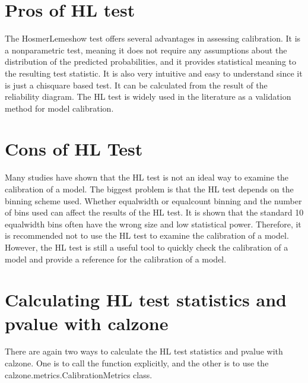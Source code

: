 \documentclass[letterpaper,10pt,english]{sphinxmanual}
\begin{document}
\section{Pros of HL test}
\label{\detokenize{notebooks/hl_test:Pros-of-HL-test}}
\sphinxAtStartPar
The Hosmer\sphinxhyphen{}Lemeshow test offers several advantages in assessing calibration. It is a non\sphinxhyphen{}parametric test, meaning it does not require any assumptions about the distribution of the predicted probabilities, and it provides statistical meaning to the resulting test statistic. It is also very intuitive and easy to understand since it is just a chi\sphinxhyphen{}square based test. It can be calculated from the result of the reliability diagram. The HL test is widely used in the literature as a validation method
for model calibration.


\section{Cons of HL Test}
\label{\detokenize{notebooks/hl_test:Cons-of-HL-Test}}
\sphinxAtStartPar
Many studies have shown that the HL test is not an ideal way to examine the calibration of a model. The biggest problem is that the HL test depends on the binning scheme used. Whether equal\sphinxhyphen{}width or equal\sphinxhyphen{}count binning and the number of bins used can affect the results of the HL test. It is shown that the standard 10 equal\sphinxhyphen{}width bins often have the wrong size and low statistical power. Therefore, it is recommended not to use the HL test to examine the calibration of a model. However, the HL test
is still a useful tool to quickly check the calibration of a model and provide a reference for the calibration of a model.


\section{Calculating HL test statistics and p\sphinxhyphen{}value with calzone}
\label{\detokenize{notebooks/hl_test:Calculating-HL-test-statistics-and-p-value-with-calzone}}
\sphinxAtStartPar
There are again two ways to calculate the HL test statistics and p\sphinxhyphen{}value with calzone. One is to call the function explicitly, and the other is to use the calzone.metrics.CalibrationMetrics class.
\end{document}
